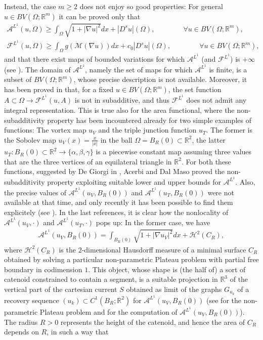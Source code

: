 \documentclass[a4paper,11pt]{article}
\numberwithin{equation}{section}
\newcommand{\Om}{\Omega}
\newcommand{\R}{\mathbb{R}}
\begin{document}
Instead, the case $m\geq2$ does not enjoy so good properties: For general $u\in BV(\Om;\R^m)$ it can be proved only that 
 \begin{align}\label{1.6}
	\mathcal A^{L^1}(u,\Om)\geq \int_\Om\sqrt{1+|\nabla u|^2}dx+|D^su|(\Om), \qquad \qquad \forall u\in BV(\Om;\R^m),\nonumber\\
		\mathcal F^{L^1}(u,\Om)\geq \int_\Om g(\mathcal M(\nabla u))dx+c_0|D^su|(\Om), \qquad \qquad \forall u\in BV(\Om;\R^m),
\end{align}
and that there exist maps of bounded variations for which $\mathcal A^{L^1}$ (and $\mathcal F^{L^1}$) is $+\infty$ (see \cite{BePaTe:15,BePaTe:16}). The domain of $\mathcal A^{L^1}$, namely the set of maps for which $\mathcal A^{L^1}$ is finite, is a subset of $BV(\Om;\R^m)$, whose precise description is not available. Moreover, it has been proved in \cite{ADM} that, for a fixed $u\in BV(\Om;\R^m)$, the set function $A\subset\Om\rightarrow \mathcal F^{L^1}(u,A)$  is not in subadditive, and thus $\mathcal F^{L^1}$ does not admit any integral representation. This is true also for the area functional, where the non-subadditivity property has been incountered already for two simple examples of functions: The vortex map $u_V$ and the triple junction function $u_T$. The former is the Sobolev map $u_V(x)=\frac{x}{|x|}$ in the ball $\Om=B_R(0)\subset\R^2$, the latter $u_T:B_R(0)\subset\R^2\rightarrow \{\alpha,\beta,\gamma\}$ is a piecewise constant map assuming three values that are the three vertices of an equilateral triangle in $\R^2$. For both these functions,  suggested by De Giorgi in \cite{DeGiorgi:92}, Acerbi and Dal Maso proved the non-subadditivity property exploiting suitable lower and upper bounds for $\mathcal A^{L^1}$. Also, the precise values of $\mathcal A^{L^1}(u_V,B_R(0))$ and $\mathcal A^{L^1}(u_T,B_R(0))$ were not available at that time, and only recently it has been possible to find them explicitely (see \cite{BePa:10,Scala:19,BES1,BES2,BES3}). In the last references, it is clear how the nonlocality of $\mathcal A^{L^1}(u_V,\cdot)$ and $\mathcal A^{L^1}(u_T,\cdot)$ pops up: 
In the former case, we have 
\begin{align}
\mathcal A^{L^1}(u_V,B_R(0))= \int_{B_R(0)}\sqrt{1+|\nabla u_V|^2}dx+\mathcal H^2(C_R),
\end{align}
where $\mathcal H^2(C_R)$ is the $2$-dimensional Hausdorff measure of a minimal surface $C_R$ obtained by solving a particular non-parametric Plateau problem with partial free boundary in codimension $1$. This object, whose shape is (the half of) a sort of catenoid constrained to contain a segment, is a suitable projection in $\R^3$ of the vertical part of the cartesian current $S$ obtained as limit of the graphs $ G_{u_k}$ of a recovery sequence $(u_k)\subset C^1(B_R;\R^2)$ for $  \mathcal A^{L^1}(u_V,B_R(0))$ (see \cite{BES2} for the non-parametric Plateau problem and \cite{BES1,BES3} for the computation of $\mathcal A^{L^1}(u_V,B_R(0))$). The radius $R>0$ represents  the height of the catenoid, and hence the area of $C_R$ depends on $R$, in such a way that 
\end{document}
